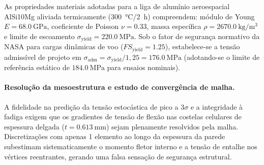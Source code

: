As propriedades materiais adotadas para a liga de alumínio aeroespacial AlSi10Mg aliviada termicamente (\SI{300}{\celsius}/\SI{2}{\hour}) compreendem: módulo de Young $E = \SI{68.0}{\giga\pascal}$, coeficiente de Poisson $\nu = \num{0.33}$, massa específica $\rho = \SI{2670.0}{\kilo\gram\per\cubic\metre}$ e limite de escoamento $\sigma_{\text{yield}} = \SI{220.0}{\mega\pascal}$. Sob o fator de segurança normativo da NASA para cargas dinâmicas de voo ($FS_{\text{yield}} = \num{1.25}$), estabelece-se a tensão admissível de projeto em $\sigma_{\text{adm}} = \sigma_{\text{yield}} / 1{,}25 = \SI{176.0}{\mega\pascal}$ (adotando-se o limite de referência estático de $\SI{184.0}{\mega\pascal}$ para ensaios nominais).

\paragraph{Resolução da mesoestrutura e estudo de convergência de malha.}
A fidelidade na predição da tensão estocástica de pico a $3\sigma$ e a integridade à fadiga exigem que os gradientes de tensão de flexão nas costelas celulares de espessura delgada ($t = \SI{0.613}{\milli\metre}$) sejam plenamente resolvidos pela malha. Discretizações com apenas 1 elemento ao longo da espessura da parede subestimam sistematicamente o momento fletor interno e a tensão de entalhe nos vértices reentrantes, gerando uma falsa sensação de segurança estrutural.

